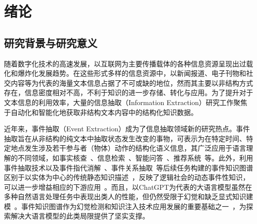\chapter{绪论}
\label{chap:intro}
\section{研究背景与研究意义}

随着数字化技术的高速发展，以互联网为主要传播载体的各种信息资源呈现出过载化和爆炸化发展趋势。在这些形式多样的信息资源中，以新闻报道、电子刊物和社交内容等为代表的海量文本信息占据了不可或缺的地位，然而其主要以非结构方式存在，信息密度相对不高，不利于知识的进一步存储、转化与应用。为了提升对于文本信息的利用效率，大量的信息抽取（Information Extraction）\cite{peng2023fsuie,jia2023modeling,黄河燕2023融合实体和上下文信息的篇章关系抽取研究,蔡宇翔2024基于跨度边界感知的嵌套命名实体识别}研究工作聚焦于自动化和智能化地获取非结构文本内容中的结构化知识数据。

近年来，事件抽取（Event Extraction）成为了信息抽取领域新的研究热点。事件抽取旨在从非结构的纯文本中抽取状态发生改变的事物，可表示为在特定时间、特定地点发生涉及若干参与者（物体）动作的结构化语义信息，其广泛应用于语言理解的不同领域，如事实核查~\cite{wu2022cross,liu2023covid}、信息检索~\cite{kuhnle2021reinforcement,zhang2021drl4ir}、智能问答~\cite{boyd2020question,wen2021resin}、推荐系统~\cite{liu2017cpmf,abdollahi2023laser}等。此外，利用事件抽取技术以及事件指代消解~\cite{lu2021span,lu2022end}、事件关系抽取~\cite{liu2020extracting,zhuang2023syntax}等后续任务构建的事件知识图谱区别于以实体为中心的传统静态知识描述~\cite{guan2023event}，反映了逻辑社会的动态事件性知识，可以进一步增益相应的下游应用~\cite{cheng2020knowledge,souza2020event}。而且，以ChatGPT为代表的大语言模型虽然在多种自然语言处理任务中表现出类人的性能，但仍然受限于幻觉和缺乏显式知识建模~\cite{wu2023brief}。事件知识图谱作为幻觉检测和知识注入技术应用发展的重要基础之一~\cite{pan2023large}，为探索解决大语言模型的此类局限提供了坚实支撑。



